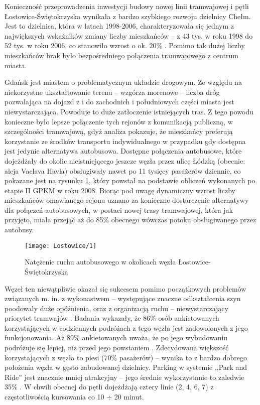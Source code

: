 \documentclass[twoside,12pt]{article}
\begin{document}
	Konieczność przeprowadzenia inwestycji budowy nowej linii tramwajowej i pętli Łostowice-Świętokrzyska wynikała z bardzo szybkiego rozwoju dzielnicy Chełm. Jest to dzielnica, która w latach 1998-2006, charakteryzowała się jednym z największych wskaźników zmiany liczby mieszkańców -- z 43 tys. w roku 1998 do 52 tys. w roku 2006, co stanowiło wzrost o ok. 20\% \cite{opracowanie_gdansk}. Pomimo tak dużej liczby mieszkańców brak było bezpośredniego połączenia tramwajowego z centrum miasta.
	
	Gdańsk jest miastem o problematycznym układzie drogowym. Ze względu na niekorzystne ukształtowanie terenu -- wzgórza morenowe -- liczba dróg pozwalająca na dojazd z i do zachodnich i południowych części miasta jest niewystarczająca. Powoduje to duże zatłoczenie istniejących tras. Z tego powodu konieczne było lepsze połączenie tych rejonów z komunikacją publiczną, w szczególności tramwajową, gdyż analiza pokazuje, że mieszkańcy preferują korzystanie ze środków transportu indywidualnego w przypadku gdy dostępna jest jedynie alternatywa autobusowa. Dostępne połączenia autobusowe, które dojeżdżały do okolic nieistniejącego jeszcze węzła przez ulicę Łódzką (obecnie: aleja Vaclava Havla) obsługiwały nawet po 11 tysięcy pasażerów dziennie, co pokazane jest na rysunku \ref{lostowice2}, który powstał na podstawie obliczeń wykonanych po etapie II GPKM w roku 2008. Biorąc pod uwagę dynamiczny wzrost liczby mieszkańców omawianego rejonu uznano za konieczne dostarczenie alternatywy dla połączeń autobusowych, w postaci nowej trasy tramwajowej, która jak przyjęto, miała przejąć aż do 85\% obecnego wówczas potoku obsługiwanego przez autobusy.
	
	\begin{figure}[H]
		\centering
		\texttt{[image: Lostowice/1]}\\
		\caption{Natężenie ruchu autobusowego w okolicach węzła Łostowice-Świętokrzyska}
		\label{lostowice2}
	\end{figure}
	
	Węzeł ten niewątpliwie okazał się sukcesem pomimo początkowych problemów związanych m. in. z wykonastwem -- występujące znaczne odkształcenia szyn poodowały duże opóźnienia, oraz z organizacją ruchu -- niewystarczający priorytet tramwajów \cite{kaszubowski}. Badania wykazały, że 86\% osób ankietowanych korzystających w codziennych podróżach z tego węzła jest zadowolonych z jego funkcjonowania. Aż 89\% ankietowanych uważa, że po jego wybudowaniu podróżuje się lepiej, niż przed jego powstaniem \cite{maciej_lada}. Zdecydowana większość korzystających z węzła to piesi (70\% pasażerów) -- wynika to z bardzo dobrego położenia węzła w gęsto zabudowanej dzielnicy. Parking w systemie ,,Park and Ride'' jest znacznie mniej atrakcyjny -- jego średnie wykorzystanie to zaledwie 35\% \cite{kaszubowski}. W chwili obecnej do pętli dojeżdżają cztery linie (2, 4, 6, 7) z częstotliwością kursowania co 10 $\div$ 20 minut. 
	
\end{document}
